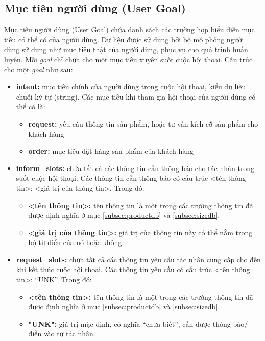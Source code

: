 \subsection{Mục tiêu người dùng (User Goal)}
\label{subsec:usergoal}
Mục tiêu người dùng (User Goal) chứa danh sách các trường hợp biểu diễn
mục tiêu có thể có của người dùng. Dữ liệu được sử dụng bởi bộ mô phỏng
người dùng sử dụng như mục tiêu thật của người dùng, phục vụ cho
quá trình huấn luyện. Mỗi \textit{goal} chỉ chứa cho một mục tiêu
xuyên suốt cuộc hội thoại. Cấu trúc cho một \textit{goal} như sau:

\begin{itemize}
    \item \textbf{intent:} mục tiêu chính của người dùng trong cuộc
    hội thoại, kiểu dữ liệu chuỗi ký tự (string). Các mục tiêu khi
    tham gia hội thoại của người dùng có thể có là:
    \begin{itemize}
        \item \textbf{request:} yêu cầu thông tin sản phẩm, hoặc
        tư vấn kích cỡ sản phẩm cho khách hàng
        \item \textbf{order:} mục tiêu đặt hàng sản phẩm của khách hàng
    \end{itemize}
    \item \textbf{inform\_slots:} chứa tất cả các thông tin cần
    thông báo cho tác nhân trong suốt cuộc hội thoại. Các thông tin
    cần thông báo có cấu trúc <tên thông tin>: <giá trị của thông tin>.
    Trong đó:
    \begin{itemize}
        \item \textbf{<tên thông tin>:} tên thông tin là một trong các
        trường thông tin đã được định nghĩa ở mục \ref{subsec:productdb}
        và \ref{subsec:sizedb}.
        \item \textbf{<giá trị của thông tin>:} giá trị của thông tin
        này có thể nằm trong bộ từ điển của nó hoặc không.
    \end{itemize}
    \item \textbf{request\_slots:} chứa tất cả các thông tin yêu cầu
    tác nhân cung cấp cho đến khi kết thúc cuộc hội thoại. Các
    thông tin yêu cầu có cấu trúc <tên thông tin>: \enquote{UNK}. Trong đó:
    \begin{itemize}
        \item \textbf{<tên thông tin>:} tên thông tin là một trong
        các trường thông tin đã được định nghĩa ở mục
        \ref{subsec:productdb} và \ref{subsec:sizedb}.
        \item \textbf{"UNK":} giá trị mặc định, có nghĩa \enquote{chưa biết},
        cần được thông báo/ điền vào từ tác nhân.
    \end{itemize}
\end{itemize}

